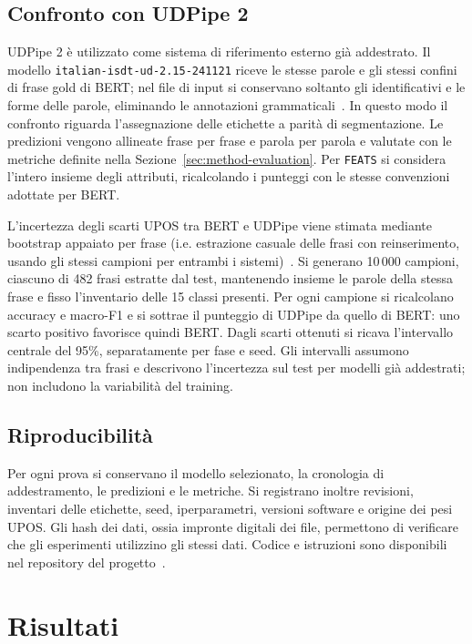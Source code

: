 \documentclass[12pt,a4paper]{report}
\begin{document}
\section{Confronto con UDPipe 2}
\label{sec:method-udpipe}

UDPipe 2 è utilizzato come sistema di riferimento esterno già addestrato. Il modello \texttt{italian-isdt-ud-2.15-241121} riceve le stesse parole e gli stessi confini di frase gold di BERT; nel file di input si conservano soltanto gli identificativi e le forme delle parole, eliminando le annotazioni grammaticali~\cite{udpipe}. In questo modo il confronto riguarda l'assegnazione delle etichette a parità di segmentazione. Le predizioni vengono allineate frase per frase e parola per parola e valutate con le metriche definite nella Sezione~\ref{sec:method-evaluation}. Per \texttt{FEATS} si considera l'intero insieme degli attributi, ricalcolando i punteggi con le stesse convenzioni adottate per BERT.

L'incertezza degli scarti UPOS tra BERT e UDPipe viene stimata mediante bootstrap appaiato per frase (i.e. estrazione casuale delle frasi con reinserimento, usando gli stessi campioni per entrambi i sistemi)~\cite{dror2018}. Si generano 10\,000 campioni, ciascuno di 482 frasi estratte dal test, mantenendo insieme le parole della stessa frase e fisso l'inventario delle 15 classi presenti. Per ogni campione si ricalcolano accuracy e macro-F1 e si sottrae il punteggio di UDPipe da quello di BERT: uno scarto positivo favorisce quindi BERT. Dagli scarti ottenuti si ricava l'intervallo centrale del 95\%, separatamente per fase e seed. Gli intervalli assumono indipendenza tra frasi e descrivono l'incertezza sul test per modelli già addestrati; non includono la variabilità del training.

\section{Riproducibilità}
\label{sec:method-reproducibility}

Per ogni prova si conservano il modello selezionato, la cronologia di addestramento, le predizioni e le metriche. Si registrano inoltre revisioni, inventari delle etichette, seed, iperparametri, versioni software e origine dei pesi UPOS. Gli hash dei dati, ossia impronte digitali dei file, permettono di verificare che gli esperimenti utilizzino gli stessi dati. Codice e istruzioni sono disponibili nel repository del progetto~\cite{repo}.

\chapter{Risultati}
\label{chap:results}
\end{document}
